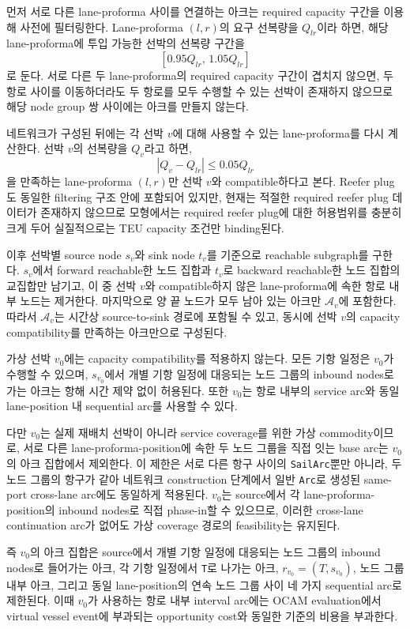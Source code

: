 \documentclass[11pt]{article}
\newcommand{\Arcs}{\mathcal{A}}
\begin{document}
먼저 서로 다른 lane-proforma 사이를 연결하는 아크는 required capacity 구간을
이용해 사전에 필터링한다. Lane-proforma $(l,r)$의 요구 선복량을 $Q_{lr}$이라 하면,
해당 lane-proforma에 투입 가능한 선박의 선복량 구간을
\[
  [0.95Q_{lr},\,1.05Q_{lr}]
\]
로 둔다. 서로 다른 두 lane-proforma의 required capacity 구간이 겹치지 않으면, 두 항로 사이를
이동하더라도 두 항로를 모두 수행할 수 있는 선박이 존재하지 않으므로 해당
node group 쌍 사이에는 아크를 만들지 않는다.

네트워크가 구성된 뒤에는 각 선박 $v$에 대해 사용할 수 있는 lane-proforma를 다시
계산한다. 선박 $v$의 선복량을 $Q_v$라고 하면,
\[
  |Q_v-Q_{lr}| \le 0.05Q_{lr}
\]
을 만족하는 lane-proforma $(l,r)$만 선박 $v$와 compatible하다고 본다. Reefer plug도
동일한 filtering 구조 안에 포함되어 있지만, 현재는 적절한 required reefer plug 데이터가 존재하지 않으므로
모형에서는 required reefer plug에 대한 허용범위를 충분히 크게 두어 실질적으로는 TEU capacity 조건만 binding된다.

이후 선박별 source node $s_v$와 sink node $t_v$를 기준으로 reachable subgraph를
구한다. $s_v$에서 forward reachable한 노드 집합과 $t_v$로 backward reachable한 노드
집합의 교집합만 남기고, 이 중 선박 $v$와 compatible하지 않은 lane-proforma에 속한
항로 내부 노드는 제거한다. 마지막으로 양 끝 노드가 모두 남아 있는 아크만
$\Arcs_v$에 포함한다. 따라서 $\Arcs_v$는 시간상 source-to-sink 경로에 포함될 수
있고, 동시에 선박 $v$의 capacity compatibility를 만족하는 아크만으로 구성된다.

가상 선박 $v_0$에는 capacity compatibility를 적용하지 않는다. 모든 기항 일정은
$v_0$가 수행할 수 있으며, $s_{v_0}$에서 개별 기항 일정에 대응되는 노드 그룹의
inbound nodes로 가는 아크는 항해 시간 제약 없이 허용된다. 또한 $v_0$는 항로 내부의 service arc와
동일 lane-position 내 sequential arc를 사용할 수 있다.

다만 $v_0$는 실제 재배치 선박이 아니라 service coverage를 위한 가상 commodity이므로,
서로 다른 lane-proforma-position에 속한 두 노드 그룹을 직접 잇는 base arc는
$v_0$의 아크 집합에서 제외한다. 이 제한은 서로 다른 항구 사이의 \texttt{SailArc}뿐만
아니라, 두 노드 그룹의 항구가 같아 네트워크 construction 단계에서 일반 \texttt{Arc}로
생성된 same-port cross-lane arc에도 동일하게 적용된다. $v_0$는 source에서 각
lane-proforma-position의 inbound nodes로 직접 phase-in할 수 있으므로, 이러한
cross-lane continuation arc가 없어도 가상 coverage 경로의 feasibility는 유지된다.

즉 $v_0$의 아크 집합은 source에서 개별 기항 일정에 대응되는 노드 그룹의 inbound
nodes로 들어가는 아크, 각 기항 일정에서 \texttt{T}로 나가는 아크,
$r_{v_0}=(T,s_{v_0})$, 노드 그룹 내부 아크, 그리고 동일 lane-position의 연속
노드 그룹 사이 네 가지 sequential arc로 제한된다. 이때 $v_0$가 사용하는 항로 내부 interval arc에는 OCAM
evaluation에서 virtual vessel event에 부과되는 opportunity cost와 동일한 기준의
비용을 부과한다.
\end{document}
